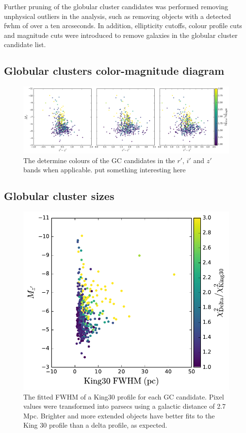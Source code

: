 \documentclass[useAMS,usenatbib]{mn2e}
\begin{document}
Further pruning of the globular cluster candidates was performed removing unphysical outliers in the analysis, such as removing objects with a detected fwhm of over a ten arcseconds. In addition, ellipticity cutoffs, colour profile cuts and magnitude cuts were introduced to remove galaxies in the globular cluster candidate list. 


\subsection{Globular clusters color-magnitude diagram}
\label{sec:gc_cmd}

\begin{figure}
	\includegraphics[width=\textwidth]{images/colour.pdf}
	\caption{The determine colours of the GC candidates in the $r'$, $i'$ and $z'$ bands when applicable.{\color{red} put something interesting here} }
	\label{fig:colour}
\end{figure}

\subsection{Globular cluster sizes}
\label{sec:gc_sizes}
\begin{figure}
	\includegraphics[width=\columnwidth]{images/kingFWHM.pdf}
	\caption{The fitted FWHM of a King30 profile for each GC candidate. Pixel values were transformed into parsecs using a galactic distance of 2.7 Mpc. Brighter and more extended objects have better fits to the King 30 profile than a delta profile, as expected.}
	\label{fig:kfwhm}
\end{figure}
\end{document}
